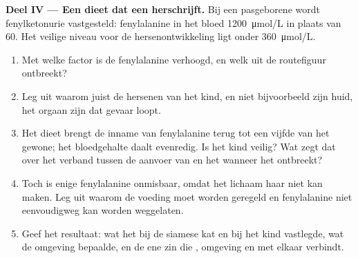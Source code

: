\begin{problem}
\medskip
\noindent\textbf{Deel IV --- Een dieet dat een  herschrijft.}
Bij een pasgeborene wordt fenylketonurie vastgesteld: fenylalanine in het
bloed \qty{1200}{\micro mol/L} in plaats van \num{60}. Het veilige niveau
voor de hersenontwikkeling ligt onder \qty{360}{\micro mol/L}.
\begin{enumerate}[resume]
  \item Met welke factor is de fenylalanine verhoogd, en welk  uit de
        routefiguur ontbreekt?
  \item Leg uit waarom juist de hersenen van het kind, en niet
        bijvoorbeeld zijn huid, het orgaan zijn dat gevaar loopt.
  \item Het dieet brengt de inname van fenylalanine terug tot een vijfde
        van het gewone; het bloedgehalte daalt evenredig. Is het kind
        veilig? Wat zegt dat over het verband tussen de aanvoer van
         en het  wanneer het  ontbreekt?
  \item Toch is enige fenylalanine onmisbaar, omdat het lichaam haar niet
        kan maken. Leg uit waarom de voeding moet worden geregeld en
        fenylalanine niet eenvoudigweg kan worden weggelaten.
  \item Geef het resultaat: wat het  bij de siamese kat en bij het
        kind vastlegde, wat de omgeving bepaalde, en de ene zin die
        , omgeving en  met elkaar verbindt.
\end{enumerate}
\end{problem}
